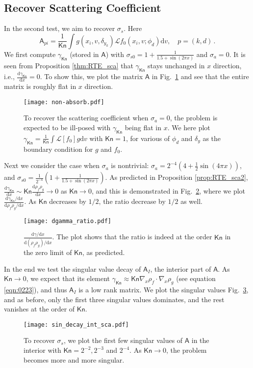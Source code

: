 \documentclass[english,reqno]{amsart}
\theoremstyle{plain}
\theoremstyle{definition} %
\newcommand{\Amat}{\mathsf{A}}
\newcommand{\rd}{\mathrm{d}}
\newcommand{\Kn}{\mathsf{Kn}}
\begin{document}
\subsection{Recover Scattering Coefficient}
In the second test, we aim to recover $\sigma_s$. Here 
\[
\Amat_{pi}=\frac{1}{\Kn} \int g(x_i,v, \delta_{y_k})\mathcal{L}f_0(x_i,v; \phi_d)\rd v, \quad p = (k,d)\,.
\]
We first compute $\gamma_\Kn$ (stored in $\Amat$) with $\sigma_{s0}=1+\frac{1}{1.5+\sin(2\pi x)}$ and $\sigma_{a}=0$. It is seen from Proposition \ref{thm:RTE_sca} that $\gamma_\Kn$ stays unchanged in $x$ direction, i.e., $\frac{\rd\gamma_\Kn}{\rd x} = 0$. To show this, we plot the matrix $\Amat$ in Fig.~\ref{fig:non-absorb} and see that the entire matrix is roughly flat in $x$ direction.
\begin{figure}[htp]
\centering
  \texttt{[image: non-absorb.pdf]}
  \caption{To recover the scattering coefficient when $\sigma_a=0$, the problem is expected to be ill-posed with $\gamma_\Kn$ being flat in $x$. We here plot $\gamma_\Kn = \frac{1}{\Kn}\int \mathcal{L}[f_0]g\rd{v}$ with $\Kn = 1$, for various of $\phi_d$ and $\delta_y$ as the boundary condition for $g$ and $f_0$.}
  \label{fig:non-absorb}
\end{figure}

Next we consider the case when $\sigma_a$ is nontrivial: $\sigma_{a}=2^{-4}(4+\frac{1}{2}\sin(4\pi x))$, and $\sigma_{s0}=\frac{1}{2^{-4}}(1+\frac{1}{1.5+\sin(2\pi x)})$. As predicted in Proposition \ref{prop:RTE_sca2}, $\frac{\rd\gamma_\Kn}{\rd x} \sim \Kn\frac{\rd\rho_f\rho_g}{\rd x}\to 0$ as $\Kn\to 0$, and this is demonstrated in Fig.~\ref{fig:dgamma_ratio}, where we plot $\frac{\rd\gamma_\Kn/\rd x}{\rd\rho_f\rho_g/\rd x}$. As $\Kn$ decreases by $1/2$, the ratio decrease by $1/2$ as well.

\begin{figure}[htp]
\centering
  \texttt{[image: dgamma\_ratio.pdf]}
  \caption{$\frac{\rd\gamma/\rd x}{\rd(\rho_f\rho_g)/\rd x}$. The plot shows that the ratio is indeed at the order $\Kn$ in the zero limit of $\Kn$, as predicted.}
  \label{fig:dgamma_ratio}
\end{figure}

In the end we test the singular value decay of $\Amat_I$, the interior part of $\Amat$. As $\Kn \rightarrow 0$, we expect that its element $\gamma_\Kn \approx \Kn \nabla_x\rho_f\cdot\nabla_x\rho_g$ (see equation \eqref{eqn:0223}), and thus $\Amat_I$ is a low rank matrix. We plot the singular values Fig.~\ref{fig:sin_decay_int_sca}, and as before, only the first three singular values dominates, and the rest vanishes at the order of $\Kn$. 
\begin{figure}[htp]
\centering
  \texttt{[image: sin\_decay\_int\_sca.pdf]}
  \caption{To recover $\sigma_s$, we plot the first few singular values of $\Amat$ in the interior with $\Kn=2^{-2},2^{-3}$ and $2^{-4}$. As $\Kn\to 0$, the problem becomes more and more singular. }
  \label{fig:sin_decay_int_sca}
\end{figure}
\end{document}
